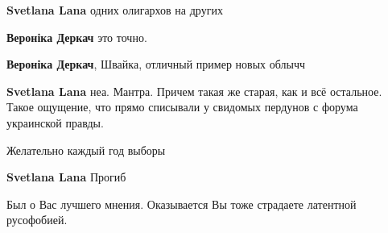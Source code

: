 \begin{itemize}
\begin{itemize}
\textbf{Svetlana Lana} одних олигархов на других

 
\textbf{Вероніка Деркач} это точно.

 
\textbf{Вероніка Деркач}, Швайка, отличный пример новых облычч

 
\textbf{Svetlana Lana} неа. Мантра. Причем такая же старая, как и всё остальное. Такое ощущение, что прямо списывали у свидомых пердунов с форума украинской правды.

 
Желательно каждый год выборы

 
\textbf{Svetlana Lana} Прогиб

\end{itemize}

 
Был о Вас лучшего мнения. Оказывается Вы тоже страдаете латентной русофобией.


\begin{itemize}
 

\end{itemize}
\end{itemize}
